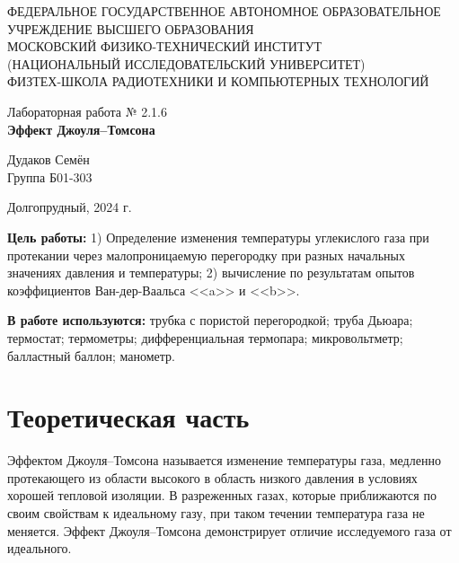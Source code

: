 \documentclass[a4paper,12pt]{article} %
\begin{document}
\begin{center}
	\footnotesize{ФЕДЕРАЛЬНОЕ ГОСУДАРСТВЕННОЕ АВТОНОМНОЕ ОБРАЗОВАТЕЛЬНОЕ 			УЧРЕЖДЕНИЕ ВЫСШЕГО ОБРАЗОВАНИЯ}\\
	\footnotesize{МОСКОВСКИЙ ФИЗИКО-ТЕХНИЧЕСКИЙ ИНСТИТУТ\\(НАЦИОНАЛЬНЫЙ 			ИССЛЕДОВАТЕЛЬСКИЙ УНИВЕРСИТЕТ)}\\
	\footnotesize{ФИЗТЕХ-ШКОЛА РАДИОТЕХНИКИ И КОМПЬЮТЕРНЫХ ТЕХНОЛОГИЙ\\}
	\hfill \break
	\hfill \break
	\hfill \break
	\hfill \break
\end{center}




\begin{center}   
    \hfill \break
	\hfill \break
	\hfill \break
	\hfill \break
	\large{Лабораторная работа № 2.1.6\\\textbf{Эффект Джоуля--Томсона}}\\
	\hfill \break
	\hfill \break
	\hfill \break
	\hfill \break
	\begin{flushright}
		Дудаков Семён\\
		Группа Б01-303
	\end{flushright}
	\hfill \break
	\hfill \break
	\hfill \break
\end{center}
\hfill \break
\hfill \break
\hfill \break
\hfill \break
\begin{center}
	Долгопрудный, 2024 г.
\end{center}
\thispagestyle{empty}



\newpage

\textbf{Цель работы:}
 1) Определение изменения температуры углекислого газа при протекании через малопроницаемую перегородку при разных начальных значениях давления и температуры; 2) вычисление по результатам опытов коэффициентов Ван-дер-Ваальса <<a>> и <<b>>.


\textbf{В работе используются:} трубка с пористой перегородкой; труба Дьюара; термостат; термометры; дифференциальная термопара; микровольтметр; балластный баллон; манометр.
\section{Теоретическая часть}

Эффектом Джоуля–Томсона называется изменение температуры газа, медленно протекающего из области высокого в область низкого давления в условиях хорошей тепловой изоляции. В разреженных газах, которые приближаются по своим свойствам к идеальному газу, при таком течении температура газа не меняется. Эффект Джоуля–Томсона демонстрирует отличие исследуемого газа от идеального.
\end{document}
